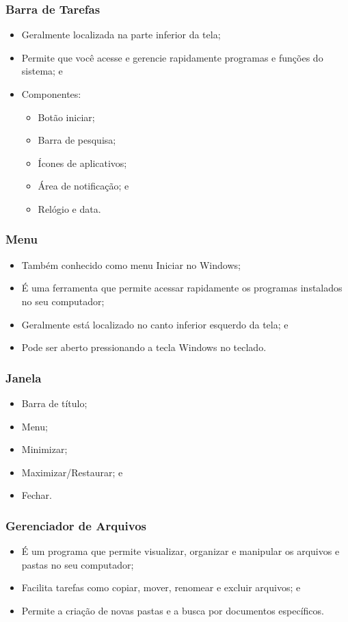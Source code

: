 \documentclass[aspectratio=169]{beamer} %
\begin{document}
\begin{frame}
	\frametitle{Barra de Tarefas}
	
	\begin{itemize}
		\item Geralmente localizada na parte inferior da tela;
		\item Permite que você acesse e gerencie rapidamente programas e funções do sistema; e
		\item Componentes:
		\begin{itemize}
			\item Botão iniciar;
			\item Barra de pesquisa;
			\item Ícones de aplicativos;
			\item Área de notificação; e
			\item Relógio e data.
		\end{itemize}
	\end{itemize}
\end{frame}

\begin{frame}
	\frametitle{Menu}
	
	\begin{itemize}
		\item Também conhecido como menu Iniciar no Windows;
		\item É uma ferramenta que permite acessar rapidamente os programas instalados no seu computador;
		\item Geralmente está localizado no canto inferior esquerdo da tela; e
		\item Pode ser aberto pressionando a tecla Windows no teclado.
	\end{itemize}
\end{frame}

\begin{frame}
	\frametitle{Janela}
	
	\begin{itemize}
		\item Barra de título;
		\item Menu;
		\item Minimizar;
		\item Maximizar/Restaurar; e
		\item Fechar.
	\end{itemize}
\end{frame}

\begin{frame}
	\frametitle{Gerenciador de Arquivos}
	
	\begin{itemize}
		\item É um programa que permite visualizar, organizar e manipular os arquivos e pastas no seu computador;
		\item Facilita tarefas como copiar, mover, renomear e excluir arquivos; e
		\item Permite a criação de novas pastas e a busca por documentos específicos.
	\end{itemize}
\end{frame}
\end{document}
